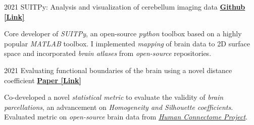 

\begin{cventries}
    
  \cventry
    {2021} %
  	{SUITPy: Analysis and visualization of cerebellum imaging data} %
  	{\href{https://github.com/DiedrichsenLab/SUITPy}{\textbf{Github [Link]}}}
  	{}
    {
      \begin{cvitems} %
      	\item {Core developer of \textit{SUITPy}, an open-source \textit{python} toolbox based on a highly popular \textit{MATLAB} toolbox. I implemented \textit{mapping} of brain data to 2D surface space and incorporated \textit{brain atlases} from \textit{open-source} repositories.}
      \end{cvitems}
    }
    
  \cventry
    {2021} %
    {Evaluating functional boundaries of the brain using a novel distance coefficient} %
    {\href{https://www.biorxiv.org/content/10.1101/2021.05.11.443151v1.full.pdf}{\textbf{Paper [Link]}}}
    {}
    {
      \begin{cvitems} %
        \item {Co-developed a novel \textit{statistical metric} to evaluate the validity of \textit{brain parcellations}, an advancement on \textit{Homogeneity and Silhouette coefficients}. Evaluated metric on \textit{open-source} brain data from \href{http://www.humanconnectomeproject.org/}{\textit{Human Connectome Project}}.}
      \end{cvitems}
    }
    

\end{cventries}
